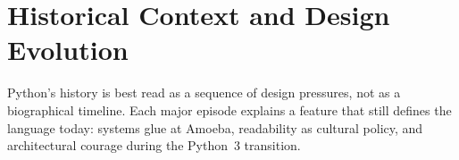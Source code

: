 \section{Historical Context and Design Evolution}

Python's history is best read as a sequence of design pressures, not as a biographical timeline. Each major episode explains a feature that still defines the language today: systems glue at Amoeba, readability as cultural policy, and architectural courage during the Python~3 transition.
